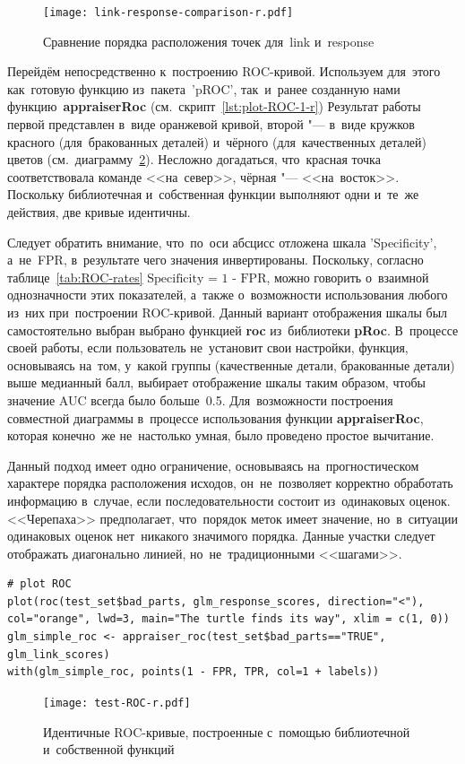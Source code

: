 \documentclass[]{scrreprt}
\begin{document}
%
%
\begin{figure}[ht]
	\centering
	\texttt{[image: link-response-comparison-r.pdf]}
	\caption{Сравнение порядка расположения точек для~\foreignlanguage{english}{link} и~\foreignlanguage{english}{response}}
	\label{fig:link-response-comparison-r}
\end{figure}
%

Перейдём непосредственно к~построению ROC-кривой. Используем для~этого как~готовую функцию из~пакета~'pROC', так~и~ранее созданную нами функцию~\textbf{appraiserRoc} (см.~скрипт~\ref{lst:plot-ROC-1-r}) Результат работы первой представлен в~виде оранжевой кривой, второй "--- в~виде кружков красного (для~бракованных деталей) и~чёрного (для~качественных деталей) цветов (см.~диаграмму~\ref{fig:test-ROC-r}). Несложно догадаться, что~красная точка соответствовала команде <<на~север>>, чёрная "--- <<на~восток>>. Поскольку библиотечная и~собственная функции выполняют одни и~те~же действия, две кривые идентичны.

Следует обратить внимание, что~по~оси абсцисс отложена шкала \foreignlanguage{english}{'Specificity'}, а~не~FPR, в~результате чего значения инвертированы. Поскольку, согласно таблице~\ref{tab:ROC-rates} $\text{Specificity = 1 - FPR}$, можно говорить о~взаимной однозначности этих показателей, а~также о~возможности использования любого из~них при~построении ROC-кривой. Данный вариант отображения шкалы был самостоятельно выбран выбрано функцией \textbf{roc} из~библиотеки \textbf{pRoc}. В~процессе своей работы, если пользователь не~установит свои настройки, функция, основываясь на~том, у~какой группы (качественные детали, бракованные детали) выше медианный балл, выбирает отображение шкалы таким образом, чтобы значение AUC всегда было больше~0.5. Для~возможности построения совместной диаграммы в~процессе использования функции \textbf{appraiserRoc}, которая конечно~же не~настолько умная, было проведено простое вычитание.

Данный подход имеет одно ограничение, основываясь на~прогностическом характере порядка расположения исходов, он~не~позволяет корректно обработать информацию в~случае, если последовательности состоит из~одинаковых оценок. <<Черепаха>> предполагает, что~порядок меток имеет значение, но~в~ситуации одинаковых оценок нет~никакого значимого порядка. Данные участки следует отображать диагонально линией, но~не~традиционными <<шагами>>.
%
\begin{lstlisting}[float, caption = Построение ROC-кривой с~помощью библиотечной и~собственной функций, firstnumber=1, label= lst:plot-ROC-1-r]
# plot ROC
plot(roc(test_set$bad_parts, glm_response_scores, direction="<"),
col="orange", lwd=3, main="The turtle finds its way", xlim = c(1, 0))
glm_simple_roc <- appraiser_roc(test_set$bad_parts=="TRUE", glm_link_scores)
with(glm_simple_roc, points(1 - FPR, TPR, col=1 + labels))
\end{lstlisting}
%
\begin{figure}[ht]
	\centering
	\texttt{[image: test-ROC-r.pdf]}
	\caption{Идентичные ROC-кривые, построенные с~помощью библиотечной и~собственной функций}
	\label{fig:test-ROC-r}
\end{figure}
%
\end{document}
